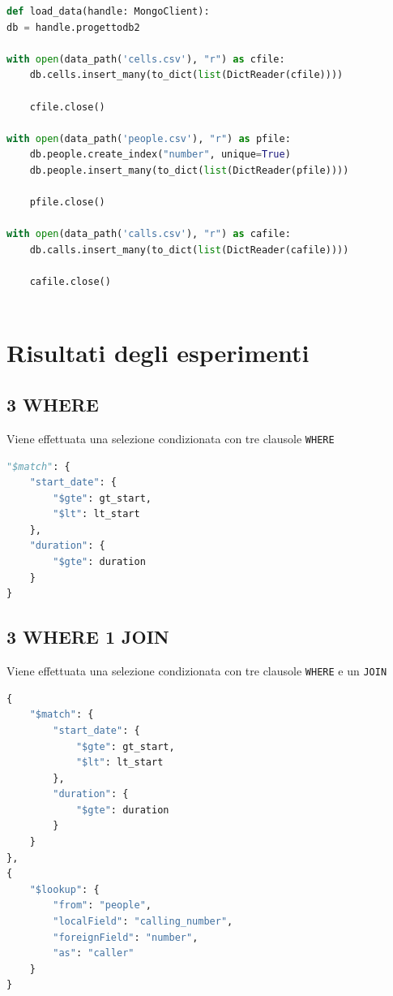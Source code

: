     \begin{lstlisting}[language=Python, caption=load\_data()]
def load_data(handle: MongoClient):
db = handle.progettodb2

with open(data_path('cells.csv'), "r") as cfile:
    db.cells.insert_many(to_dict(list(DictReader(cfile))))

    cfile.close()

with open(data_path('people.csv'), "r") as pfile:
    db.people.create_index("number", unique=True)
    db.people.insert_many(to_dict(list(DictReader(pfile))))

    pfile.close()

with open(data_path('calls.csv'), "r") as cafile:
    db.calls.insert_many(to_dict(list(DictReader(cafile))))

    cafile.close()
        
    \end{lstlisting}



\section{Risultati degli esperimenti}

    \subsection{3 WHERE}
    Viene effettuata una selezione condizionata con tre clausole \texttt{WHERE}

    \begin{lstlisting}[language=Python, caption=MongoDB]
"$match": {
    "start_date": {
        "$gte": gt_start,
        "$lt": lt_start
    },
    "duration": {
        "$gte": duration
    }
}
    \end{lstlisting}


    \pagebreak
    \subsection{3 WHERE 1 JOIN}
    Viene effettuata una selezione condizionata con tre clausole \texttt{WHERE}
    e un \texttt{JOIN}
    \begin{lstlisting}[language=Python, caption=MongoDB]
{
    "$match": {
        "start_date": {
            "$gte": gt_start,
            "$lt": lt_start
        },
        "duration": {
            "$gte": duration
        }
    }
},
{
    "$lookup": {
        "from": "people",
        "localField": "calling_number",
        "foreignField": "number",
        "as": "caller"
    }
}
    \end{lstlisting}
    

